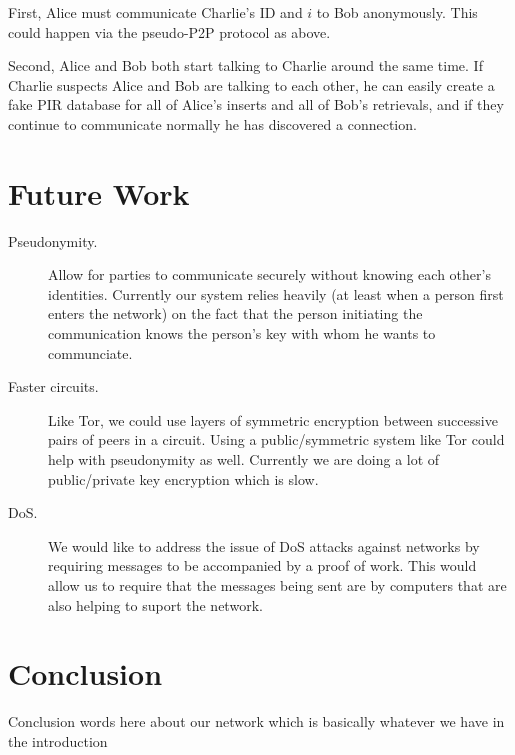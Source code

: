 \documentclass[twocolumn,11pt,english]{article}
\begin{document}
First, Alice must communicate Charlie's ID and $i$ to Bob anonymously. This could happen via the pseudo-P2P protocol as above. 

Second, Alice and Bob both start talking to Charlie around the same time. If Charlie suspects Alice and Bob are talking to each other, he can easily create a fake PIR database for all of Alice's inserts and all of Bob's retrievals, and if they continue to communicate normally he has discovered a connection. 


\section{Future Work}
\begin{description}
\item[Pseudonymity.] Allow for parties to communicate securely without knowing each other's identities. Currently our system relies heavily (at least when a person first enters the network) on the fact that the person initiating the communication knows the person's key with whom he wants to communciate.

\item[Faster circuits.] Like Tor, we could use layers of symmetric encryption between successive pairs of peers in a circuit. Using a public/symmetric system like Tor could help with pseudonymity as well. Currently we are doing a lot of public/private key encryption which is slow.

\item[DoS.] We would like to address the issue of DoS attacks against networks by requiring messages to be accompanied by a proof of work. This would allow us to require that the messages being sent are by computers that are also helping to suport the network.
\end{description}

\section{Conclusion}
Conclusion words here about our network which is basically whatever we have in the introduction

\newpage



\end{document}
